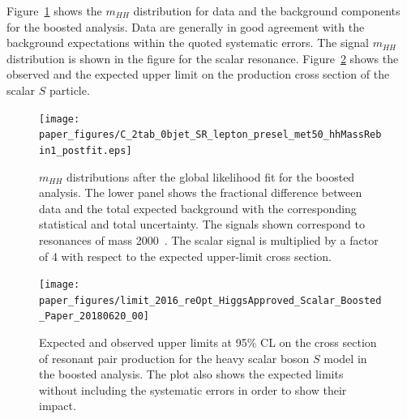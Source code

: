 Figure~\ref{fig:boosted_postfit_mhh} shows the $m_{HH}$ distribution for
data and the background components for the boosted analysis.
Data are generally in good agreement with the background expectations within the quoted systematic errors.
The signal $m_{HH}$ distribution is shown in the figure for  the scalar resonance.
Figure~\ref{fig:boosted_only_limits} shows the observed and the expected
upper limit on the production cross section of the scalar $S$ particle.

\begin{figure}
\begin{center}
\texttt{[image: paper\_figures/C\_2tab\_0bjet\_SR\_lepton\_presel\_met50\_hhMassRebin1\_postfit.eps]}

\end{center}
\caption[$m_{HH}$ distributions after the global likelihood fit for the boosted analysis]{$m_{HH}$ distributions after the global likelihood fit for the boosted analysis. The lower panel shows the fractional difference between data and the total expected background with the corresponding statistical and total uncertainty.  The signals shown correspond to resonances of mass 2000~\gev. The scalar signal is multiplied by a factor of 4 with respect to the expected upper-limit cross section.}%
  \label{fig:boosted_postfit_mhh}
\end{figure}
\FloatBarrier
 
\begin{figure}[!h]
\begin{center}
\texttt{[image: paper\_figures/limit\_2016\_reOpt\_HiggsApproved\_Scalar\_Boosted\_Paper\_20180620\_00]}
\caption[Expected and observed upper limits at 95\% CL on the cross section of resonant pair production for the heavy scalar boson $S$ model in the boosted analysis]{Expected and observed upper limits at 95\% CL on the cross section of resonant pair production for the heavy scalar boson $S$ model in the boosted analysis. The plot also shows the expected limits without including the systematic errors in order to show their impact.
          }
 
\label{fig:boosted_only_limits}
\end{center}
\end{figure}
